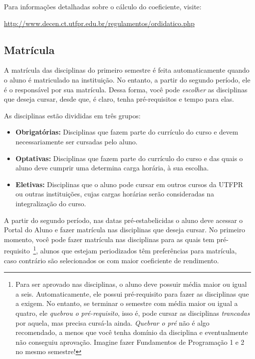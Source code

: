 \documentclass[a4paper,12pt,openany]{article}
\begin{document}
Para informações detalhadas sobre o cálculo do coeficiente, visite: 

\url{http://www.decen.ct.utfpr.edu.br/regulamentos/ordidatico.php}



\subsection{Matrícula}

A matrícula das disciplinas do primeiro semestre é feita automaticamente quando o aluno é matriculado na instituição. No entanto, a partir do segundo período, ele é o responsável por sua matrícula. Dessa forma, você pode \textit{escolher} as disciplinas que deseja cursar, desde que, é claro, tenha pré-requisitos e tempo para elas. 

As disciplinas estão divididas em três grupos:

\begin{itemize}

    \item \textbf{Obrigatórias:} Disciplinas que fazem parte do currículo do curso e devem necessariamente ser cursadas pelo aluno.

    \item \textbf{Optativas:} Disciplinas que fazem parte do currículo do curso e das quais o aluno deve cumprir uma determina carga horária, à sua escolha.

    \item \textbf{Eletivas:} Disciplinas que o aluno pode cursar em outros cursos da UTFPR ou outras instituições, cujas cargas horárias serão consideradas na integralização do curso.

\end{itemize}

A partir do segundo período, nas datas pré-estabelicidas o aluno deve acessar o Portal do Aluno e fazer matrícula nas disciplinas que deseja cursar. No primeiro momento, você pode fazer matrícula nas disciplinas para as quais tem pré-requisito~\footnote{Para ser aprovado nas disciplinas, o aluno deve possuir média maior ou igual a seis. Automaticamente, ele possui pré-requisito para fazer as disciplinas que a exigem. No entanto, se terminar o semestre com média maior ou igual a quatro, ele \textit{quebrou o pré-requisito}, isso é, pode cursar as disciplinas \textit{trancadas} por aquela, mas precisa cursá-la ainda. \textit{Quebrar o pré} não é algo recomendado, a menos que você tenha domínio da disciplina e eventualmente não conseguiu aprovação. Imagine fazer Fundamentos de Programação 1 e 2 no mesmo semestre!}, 
alunos que estejam periodizados têm preferências para matrícula, caso contrário são selecionados os com maior coeficiente de rendimento. 
\end{document}
